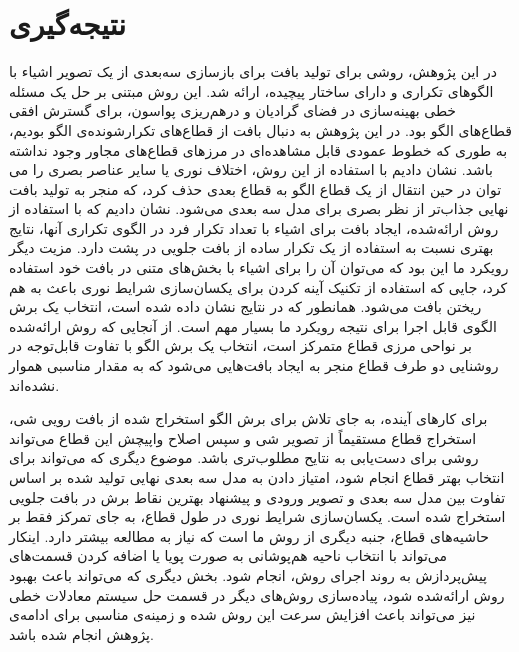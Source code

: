 
\chapter{نتیجه‌گیری}
\label{section_conclusion}
در این پژوهش، روشی برای تولید بافت برای بازسازی سه‌بعدی از یک تصویر اشیاء با الگو‌های تکراری و دارای ساختار پیچیده، ارائه شد. این روش مبتنی بر حل یک مسئله خطی بهینه‌سازی در فضای گرادیان و در‌هم‌ریزی پواسون، برای گسترش افقی قطاع‌های الگو بود. در این پژوهش به دنبال بافت از قطاع‌های تکرار‌شونده‌ی الگو بودیم، به طوری که خطوط عمودی قابل مشاهده‌ای در مرزهای قطاع‌های مجاور وجود نداشته باشد. 
%
نشان دادیم با استفاده از این روش، اختلاف نوری یا سایر عناصر بصری را می توان در حین انتقال از یک قطاع الگو به قطاع بعدی حذف کرد، که منجر به تولید بافت نهایی جذاب‌تر از نظر بصری برای مدل سه بعدی می‌شود. نشان دادیم که با استفاده از روش ارائه‌شده، ایجاد بافت برای اشیاء با تعداد تکرار فرد در الگوی تکراری آنها، نتایج بهتری نسبت به استفاده از یک تکرار ساده از بافت جلویی در پشت دارد. مزیت دیگر رویکرد ما این بود که می‌توان آن را برای اشیاء با بخش‌های متنی در بافت خود استفاده کرد، جایی که استفاده از تکنیک آینه کردن برای یکسان‌سازی شرایط نوری باعث به هم ریختن بافت می‌شود. همانطور که در نتایج نشان داده شده است، انتخاب یک برش الگوی قابل اجرا برای نتیجه رویکرد ما بسیار مهم است. از آنجایی که روش ارائه‌شده بر نواحی مرزی قطاع متمرکز است، انتخاب یک برش الگو با تفاوت قابل‌توجه در روشنایی دو طرف قطاع منجر به ایجاد بافت‌هایی می‌شود که به مقدار مناسبی هموار نشده‌اند.

برای کارهای آینده، به جای تلاش برای برش الگو استخراج شده از بافت رویی شی، استخراج قطاع مستقیماً از تصویر شی و سپس اصلاح واپیچش این قطاع می‌تواند روشی برای دست‌یابی به نتایح مطلوب‌تری باشد. موضوع دیگری که می‌تواند برای انتخاب بهتر قطاع انجام شود، امتیاز دادن به مدل سه بعدی نهایی تولید شده بر اساس تفاوت بین مدل سه بعدی و تصویر ورودی و پیشنهاد بهترین نقاط برش در بافت جلویی استخراج شده است. یکسان‌سازی شرایط نوری در طول قطاع، به جای تمرکز فقط بر حاشیه‌های قطاع، جنبه دیگری از روش ما است که نیاز به مطالعه بیشتر دارد. اینکار می‌تواند با انتخاب ناحیه هم‌پوشانی به صورت پویا یا اضافه کردن قسمت‌های پیش‌پردازش به روند اجرای روش، انجام شود. بخش دیگری که می‌تواند باعث بهبود روش ارائه‌شده شود، پیاده‌سازی روش‌های دیگر در قسمت حل سیستم معادلات خطی نیز می‌تواند باعث افزایش سرعت این روش شده و زمینه‌ی مناسبی برای ادامه‌ی پژوهش انجام شده باشد.